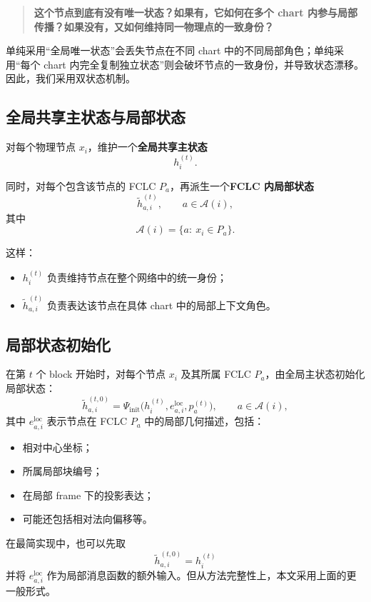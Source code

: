 \documentclass[12pt,a4paper]{ctexart}
\begin{document}
\begin{quote}
\textbf{这个节点到底有没有唯一状态？如果有，它如何在多个 chart 内参与局部传播？如果没有，又如何维持同一物理点的一致身份？}
\end{quote}

单纯采用“全局唯一状态”会丢失节点在不同 chart 中的不同局部角色；单纯采用“每个 chart 内完全复制独立状态”则会破坏节点的一致身份，并导致状态漂移。因此，我们采用双状态机制。

\subsection{全局共享主状态与局部状态}

对每个物理节点 \(x_i\)，维护一个\textbf{全局共享主状态}
\[
h_i^{(t)}.
\]

同时，对每个包含该节点的 FCLC \(P_a\)，再派生一个\textbf{FCLC 内局部状态}
\[
\tilde h_{a,i}^{(t)},
\qquad a\in\mathcal A(i),
\]
其中
\[
\mathcal A(i)=\{a:\ x_i\in P_a\}.
\]

这样：
\begin{itemize}[leftmargin=2em]
    \item \(h_i^{(t)}\) 负责维持节点在整个网络中的统一身份；
    \item \(\tilde h_{a,i}^{(t)}\) 负责表达该节点在具体 chart 中的局部上下文角色。
\end{itemize}

\subsection{局部状态初始化}

在第 \(t\) 个 block 开始时，对每个节点 \(x_i\) 及其所属 FCLC \(P_a\)，由全局主状态初始化局部状态：
\[
\tilde h_{a,i}^{(t,0)}
=
\Psi_{\mathrm{init}}
\big(
h_i^{(t)},
e_{a,i}^{\mathrm{loc}},
p_a^{(t)}
\big),
\qquad a\in\mathcal A(i),
\]
其中 \(e_{a,i}^{\mathrm{loc}}\) 表示节点在 FCLC \(P_a\) 中的局部几何描述，包括：
\begin{itemize}[leftmargin=2em]
    \item 相对中心坐标；
    \item 所属局部块编号；
    \item 在局部 frame 下的投影表达；
    \item 可能还包括相对法向偏移等。
\end{itemize}

在最简实现中，也可以先取
\[
\tilde h_{a,i}^{(t,0)} = h_i^{(t)}
\]
并将 \(e_{a,i}^{\mathrm{loc}}\) 作为局部消息函数的额外输入。但从方法完整性上，本文采用上面的更一般形式。
\end{document}

